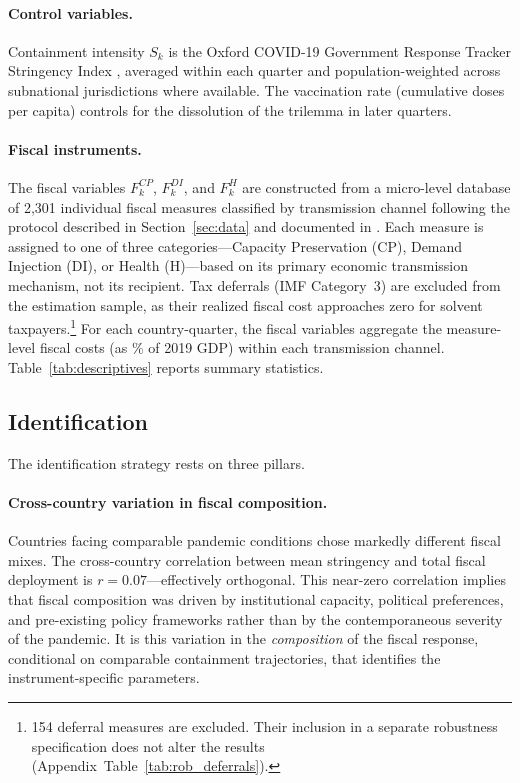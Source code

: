 \paragraph{Control variables.} Containment intensity $S_k$ is the Oxford COVID-19 Government Response Tracker Stringency Index \citep{Hale2021}, averaged within each quarter and population-weighted across subnational jurisdictions where available. The vaccination rate (cumulative doses per capita) controls for the dissolution of the trilemma in later quarters.

\paragraph{Fiscal instruments.} The fiscal variables $F_k^{CP}$, $F_k^{DI}$, and $F_k^{H}$ are constructed from a micro-level database of 2,301 individual fiscal measures classified by transmission channel following the protocol described in Section~\ref{sec:data} and documented in \citet{Codebook}. Each measure is assigned to one of three categories---Capacity Preservation (CP), Demand Injection (DI), or Health (H)---based on its primary economic transmission mechanism, not its recipient. Tax deferrals (IMF Category~3) are excluded from the estimation sample, as their realized fiscal cost approaches zero for solvent taxpayers.\footnote{154 deferral measures are excluded. Their inclusion in a separate robustness specification does not alter the results (Appendix~Table~\ref{tab:rob_deferrals}).} For each country-quarter, the fiscal variables aggregate the measure-level fiscal costs (as \% of 2019 GDP) within each transmission channel. Table~\ref{tab:descriptives} reports summary statistics.

%

\subsection{Identification}
\label{subsec:identification}

The identification strategy rests on three pillars.

\paragraph{Cross-country variation in fiscal composition.} Countries facing comparable pandemic conditions chose markedly different fiscal mixes. The cross-country correlation between mean stringency and total fiscal deployment is $r = 0.07$---effectively orthogonal. This near-zero correlation implies that fiscal composition was driven by institutional capacity, political preferences, and pre-existing policy frameworks rather than by the contemporaneous severity of the pandemic. It is this variation in the \textit{composition} of the fiscal response, conditional on comparable containment trajectories, that identifies the instrument-specific parameters.

